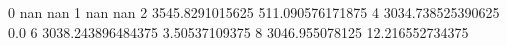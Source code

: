0 nan nan
1 nan nan
2 3545.8291015625 511.090576171875
4 3034.738525390625 0.0
6 3038.243896484375 3.50537109375
8 3046.955078125 12.216552734375
